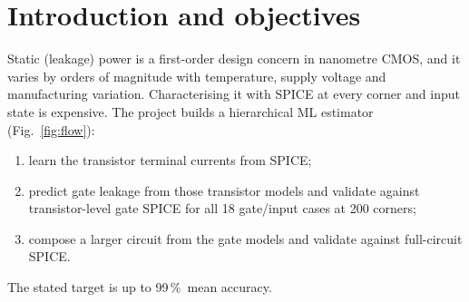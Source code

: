 \documentclass[11pt,a4paper]{article}
\newcommand{\pct}{\,\%}
\begin{document}
\section{Introduction and objectives}
Static (leakage) power is a first-order design concern in nanometre CMOS, and it varies by orders of
magnitude with temperature, supply voltage and manufacturing variation. Characterising it with SPICE at every
corner and input state is expensive. The project builds a hierarchical ML estimator
(Fig.~\ref{fig:flow}):
\begin{enumerate}[label=(\Alph*),nosep]
\item learn the transistor terminal currents from SPICE;
\item predict gate leakage from those transistor models and validate against transistor-level gate SPICE for
all 18 gate/input cases at 200 corners;
\item compose a larger circuit from the gate models and validate against full-circuit SPICE.
\end{enumerate}
The stated target is up to 99\pct\ mean accuracy.
\end{document}

